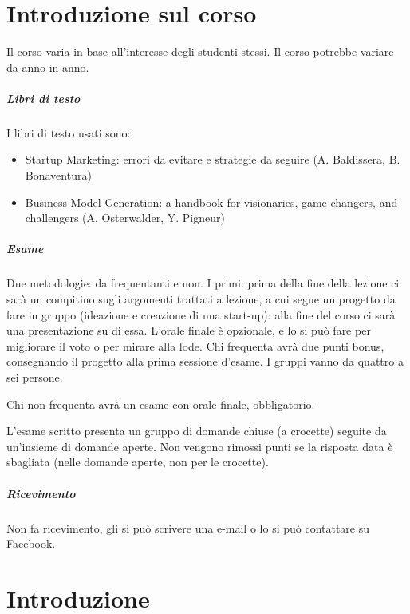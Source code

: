 \chapter*{Introduzione sul corso}

Il corso varia in base all'interesse degli studenti stessi. Il corso potrebbe
variare da anno in anno.

\paragraph*{Libri di testo} I libri di testo usati sono:
\begin{itemize}
 \item Startup Marketing: errori da evitare e strategie da seguire (A.
Baldissera, B. Bonaventura)
 \item Business Model Generation: a handbook for visionaries, game changers,
and challengers (A. Osterwalder, Y. Pigneur)
\end{itemize}

\paragraph*{Esame} Due metodologie: da frequentanti e non. I primi: prima della
fine della lezione ci sarà un compitino sugli argomenti trattati a lezione, a
cui segue un progetto da fare in gruppo (ideazione e creazione di una
start-up): alla fine del corso ci sarà una presentazione su di essa. L'orale
finale è opzionale, e lo si può fare per migliorare il voto o per mirare alla
lode. Chi frequenta avrà due punti bonus, consegnando il progetto alla prima
sessione d'esame. I gruppi vanno da quattro a sei persone.

Chi non frequenta avrà un esame con orale finale, obbligatorio.

L'esame scritto presenta un gruppo di domande chiuse (a crocette) seguite da
un'insieme di domande aperte. Non vengono rimossi punti se la risposta data è
sbagliata (nelle domande aperte, non per le crocette).

\paragraph*{Ricevimento} Non fa ricevimento, gli si può scrivere una e-mail o
lo si può contattare su Facebook.

\chapter{Introduzione}

